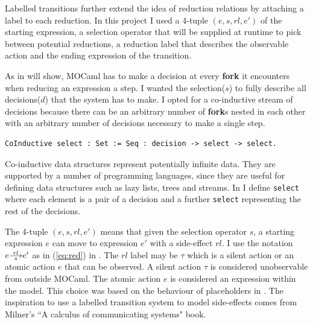 \documentclass[12pt,twoside,notitlepage]{report}
\newcommand{\red}[2]{\stackon[.05ex]{\stackunder[-0.05ex]{$\longrightarrow$}{$\scriptstyle #1$}}{$\scriptstyle #2$}}
\theoremstyle{plain}%
\theoremstyle{definition}
\theoremstyle{remark}
\begin{document}
Labelled transitions further extend the idea of reduction relations by attaching a label to each reduction. In this project I used a 4-tuple $ (e, s, rl, e') $ of the starting expression, a selection operator that will be supplied at runtime to pick between potential reductions, a reduction label that describes the observable action and the ending expression of the transition.

As  in  will show, MOCaml has to make a decision at every \textbf{fork} it encounters when reducing an expression a step. I wanted the selection($ s $) to fully describe all decisions($ d $) that the system has to make. I opted for a co-inductive stream of decisions because there can be an arbitrary number of \textbf{fork}s nested in each other with an arbitrary number of decisions necessary to make a single step. \vspace{5mm}

\begin{minipage}{\linewidth}

\begin{lstlisting}[language={Coq},caption={Coq co-inductive decision sequence}, label={lst:coqselectstar}]
CoInductive select : Set := Seq : decision -> select -> select.
\end{lstlisting}

\end{minipage}

Co-inductive data structures represent potentially infinite data.  They are supported by a number of programming languages, since they are useful for defining data structures such as lazy lists, trees and streams. In  I define \verb|select| where each element is a pair of a decision and a further \verb|select| representing the rest of the decisions. 

The 4-tuple $ (e, s, rl, e') $ means that given the selection operator $ s $, a starting expression $ e $  can move to expression $ e' $ with a side-effect $ rl $. I use the notation $ e \red{s}{rl} e' $ as in (\ref{eq:red}) in . The $ rl $ label may be $ \tau $ which is a silent action or an atomic action $ e $ that can be observed. A silent action $\tau$ is considered unobservable from outside MOCaml. The atomic action $e$ is considered an expression within the model.  This choice was based on the behaviour of placeholders in . The inspiration to use a labelled transition system to model side-effects comes from Milner's ``A calculus of communicating systems" book\cite{milner1982calculus}.
\end{document}
